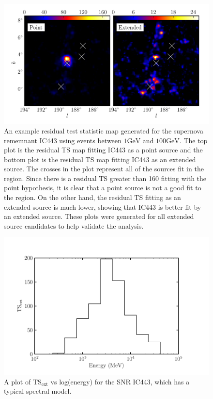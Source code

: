 \documentclass[preprint]{aastex}
\newcommand{\gev}{\text{GeV}\xspace}
\newcommand{\tsext}{\ensuremath{\text{TS}_\text{ext}}\xspace}
\begin{document}
\begin{figure}
  \begin{center}
  \includegraphics{ic443_plots/res_tsmap_ic443.pdf}

  \caption{An example residual test statistic map generated for the
  supernova rememnant IC443 using events between $1\gev$ and
  $100\gev$.  The top plot is the residual TS map fitting IC443
  as a point source and the bottom plot is the residual TS map fitting
  IC443 as an extended source. The crosses in the plot represent all of
  the sources fit in the region. Since there is a residual TS greater
  than 160 fitting with the point hypothesis, it is clear that a point
  source is not a good fit to the region. On the other hand,
  the residual TS fitting as an extended source is much lower, showing
  that IC443 is better fit by an extended source. These plots were generated
  for all extended source candidates to help validate the analysis.}
  \label{res_tsmaps}
  \end{center}
\end{figure}

\clearpage
\begin{figure}
  \begin{center}
    \includegraphics{ic443_plots/ic443_ts_ext_vs_energy.pdf}
    \caption{A plot of \tsext vs log(energy)
    for the SNR IC443, which has a typical spectral model.}
    \label{counts_slice}
  \end{center}
\end{figure}
\end{document}

